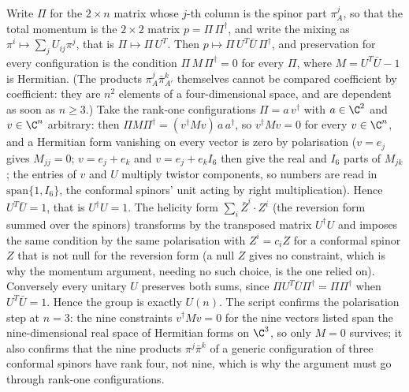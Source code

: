 Write $\Pi$ for the $2 \times n$ matrix whose $j$-th column is the spinor part $\pi^{j}_{A}$, so that the total momentum is the $2 \times 2$ matrix $p = \Pi\,\Pi^{\dagger}$, and write the mixing as $\pi^{i} \mapsto \sum_{j} U_{ij}\pi^{j}$, that is $\Pi \mapsto \Pi\,U^{T}$. Then $p \mapsto \Pi\,U^{T}\bar{U}\,\Pi^{\dagger}$, and preservation for every configuration is the condition $\Pi\,M\,\Pi^{\dagger} = 0$ for every $\Pi$, where $M = U^{T}\bar{U} - 1$ is Hermitian. (The products $\pi^{j}_{A}\bar\pi^{k}_{A'}$ themselves cannot be compared coefficient by coefficient: they are $n^{2}$ elements of a four-dimensional space, and are dependent as soon as $n \ge 3$.) Take the rank-one configurations $\Pi = a\,v^{\dagger}$ with $a \in \C^{2}$ and $v \in \C^{n}$ arbitrary: then $\Pi M \Pi^{\dagger} = (v^{\dagger}Mv)\,a\,a^{\dagger}$, so $v^{\dagger}Mv = 0$ for every $v \in \C^{n}$, and a Hermitian form vanishing on every vector is zero by polarisation ($v = e_{j}$ gives $M_{jj} = 0$; $v = e_{j} + e_{k}$ and $v = e_{j} + e_{k}I_{6}$ then give the real and $I_{6}$ parts of $M_{jk}$; the entries of $v$ and $U$ multiply twistor components, so numbers are read in $\mathrm{span}\{1, I_{6}\}$, the conformal spinors' unit acting by right multiplication). Hence $U^{T}\bar{U} = 1$, that is $U^{\dagger}U = 1$. The helicity form $\sum_{i}\bar{Z}^{i}\cdot Z^{i}$ (the reversion form summed over the spinors) transforms by the transposed matrix $U^{\dagger}U$ and imposes the same condition by the same polarisation with $Z^{i} = c_{i}Z$ for a conformal spinor $Z$ that is not null for the reversion form (a null $Z$ gives no constraint, which is why the momentum argument, needing no such choice, is the one relied on). Conversely every unitary $U$ preserves both sums, since $\Pi U^{T}\bar{U}\Pi^{\dagger} = \Pi\Pi^{\dagger}$ when $U^{T}\bar{U} = 1$. Hence the group is exactly $U(n)$. The script confirms the polarisation step at $n = 3$: the nine constraints $v^{\dagger}Mv = 0$ for the nine vectors listed span the nine-dimensional real space of Hermitian forms on $\C^{3}$, so only $M = 0$ survives; it also confirms that the nine products $\pi^{j}\bar\pi^{k}$ of a generic configuration of three conformal spinors have rank four, not nine, which is why the argument must go through rank-one configurations.
